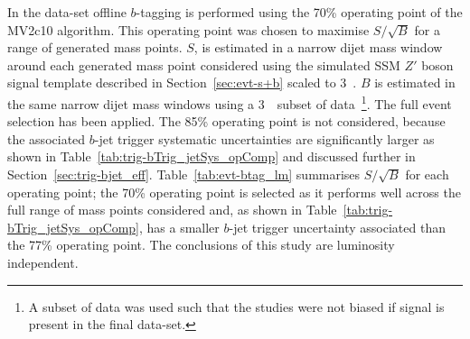 In the \lm{} data-set offline $b$-tagging is performed using the 70\% operating point of the MV2c10 algorithm.
This operating point was chosen to maximise $S/\sqrt{B}$ for a range of generated mass points.
$S$, is estimated in a narrow dijet mass window around
each generated mass point considered using the simulated SSM $Z'$ boson signal template
described in Section~\ref{sec:evt-s+b} scaled to 3~\ifb.
$B$ is estimated in the same narrow dijet mass windows using a 3~\ifb~subset of \lm{} data~\footnote{A subset of data was used such
  that the studies were not biased if signal is present in the final data-set.}.
The full \lm{} event selection has been applied.
The 85\% operating point is not considered,
because the associated $b$-jet trigger systematic uncertainties
are significantly larger as shown in Table~\ref{tab:trig-bTrig_jetSys_opComp} and discussed further in Section~\ref{sec:trig-bjet_eff}.
Table~\ref{tab:evt-btag_lm} summarises $S/\sqrt{B}$ for each operating point;
the 70\% operating point is selected as it performs well across the full range of mass points considered
and, as shown in Table~\ref{tab:trig-bTrig_jetSys_opComp}, has a smaller $b$-jet trigger uncertainty associated than the 77\% operating point.
The conclusions of this study are luminosity independent.


